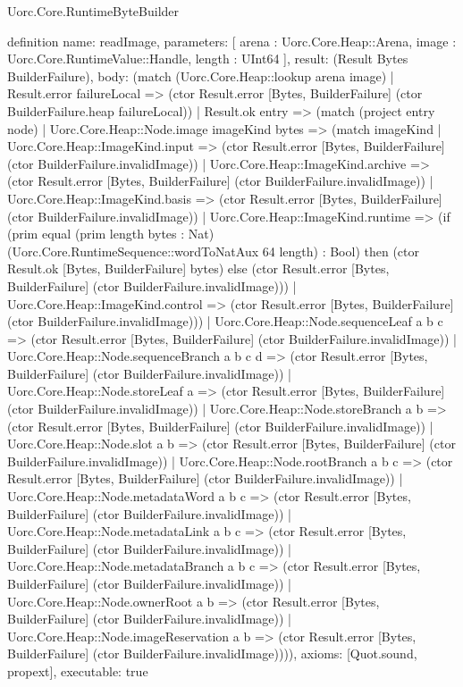 \begin{lexlean}{Uorc.Core.RuntimeByteBuilder}
\begin{semanticmodule}
definition{
  name: readImage,
  parameters: [
    arena : Uorc.Core.Heap::Arena,
    image : Uorc.Core.RuntimeValue::Handle,
    length : UInt64
  ],
  result: (Result Bytes BuilderFailure),
  body: (match (Uorc.Core.Heap::lookup arena image)
    | Result.error failureLocal => (ctor Result.error [Bytes, BuilderFailure] (ctor BuilderFailure.heap failureLocal))
    | Result.ok entry => (match (project entry node)
      | Uorc.Core.Heap::Node.image imageKind bytes => (match imageKind
        | Uorc.Core.Heap::ImageKind.input => (ctor Result.error [Bytes, BuilderFailure] (ctor BuilderFailure.invalidImage))
        | Uorc.Core.Heap::ImageKind.archive => (ctor Result.error [Bytes, BuilderFailure] (ctor BuilderFailure.invalidImage))
        | Uorc.Core.Heap::ImageKind.basis => (ctor Result.error [Bytes, BuilderFailure] (ctor BuilderFailure.invalidImage))
        | Uorc.Core.Heap::ImageKind.runtime => (if (prim equal (prim length bytes : Nat) (Uorc.Core.RuntimeSequence::wordToNatAux 64 length) : Bool) then (ctor Result.ok [Bytes, BuilderFailure] bytes) else (ctor Result.error [Bytes, BuilderFailure] (ctor BuilderFailure.invalidImage)))
        | Uorc.Core.Heap::ImageKind.control => (ctor Result.error [Bytes, BuilderFailure] (ctor BuilderFailure.invalidImage)))
      | Uorc.Core.Heap::Node.sequenceLeaf a b c => (ctor Result.error [Bytes, BuilderFailure] (ctor BuilderFailure.invalidImage))
      | Uorc.Core.Heap::Node.sequenceBranch a b c d => (ctor Result.error [Bytes, BuilderFailure] (ctor BuilderFailure.invalidImage))
      | Uorc.Core.Heap::Node.storeLeaf a => (ctor Result.error [Bytes, BuilderFailure] (ctor BuilderFailure.invalidImage))
      | Uorc.Core.Heap::Node.storeBranch a b => (ctor Result.error [Bytes, BuilderFailure] (ctor BuilderFailure.invalidImage))
      | Uorc.Core.Heap::Node.slot a b => (ctor Result.error [Bytes, BuilderFailure] (ctor BuilderFailure.invalidImage))
      | Uorc.Core.Heap::Node.rootBranch a b c => (ctor Result.error [Bytes, BuilderFailure] (ctor BuilderFailure.invalidImage))
      | Uorc.Core.Heap::Node.metadataWord a b c => (ctor Result.error [Bytes, BuilderFailure] (ctor BuilderFailure.invalidImage))
      | Uorc.Core.Heap::Node.metadataLink a b c => (ctor Result.error [Bytes, BuilderFailure] (ctor BuilderFailure.invalidImage))
      | Uorc.Core.Heap::Node.metadataBranch a b c => (ctor Result.error [Bytes, BuilderFailure] (ctor BuilderFailure.invalidImage))
      | Uorc.Core.Heap::Node.ownerRoot a b => (ctor Result.error [Bytes, BuilderFailure] (ctor BuilderFailure.invalidImage))
      | Uorc.Core.Heap::Node.imageReservation a b => (ctor Result.error [Bytes, BuilderFailure] (ctor BuilderFailure.invalidImage)))),
  axioms: [Quot.sound, propext],
  executable: true
}


\end{semanticmodule}
\end{lexlean}
